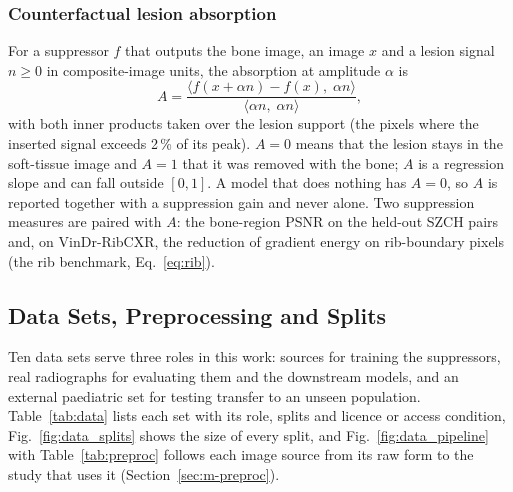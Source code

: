 \subsubsection{Counterfactual lesion absorption}
\label{sec:m-absorption}
For a suppressor $f$ that outputs the bone image, an image $x$ and a lesion signal $n\ge0$ in composite-image units, the absorption at
amplitude $\alpha$ is
\begin{equation}
A=\frac{\big\langle f(x+\alpha n)-f(x),\;\alpha n\big\rangle}{\big\langle \alpha n,\;\alpha n\big\rangle},
\label{eq:absorption}
\end{equation}
with both inner products taken over the lesion support (the pixels where the inserted signal exceeds 2\,\% of its peak). $A=0$ means that
the lesion stays in the soft-tissue image and $A=1$ that it was removed with the bone; $A$ is a regression slope and can fall outside
$[0,1]$. A model that does nothing has $A=0$, so $A$ is reported together with a suppression gain and never alone. Two suppression
measures are paired with $A$: the bone-region PSNR on the held-out SZCH pairs and, on VinDr-RibCXR, the reduction of gradient energy on
rib-boundary pixels (the rib benchmark, Eq.~\eqref{eq:rib}).

\subsection{Data Sets, Preprocessing and Splits}
\label{sec:m-data}
Ten data sets serve three roles in this work: sources for training the suppressors, real radiographs for evaluating them and the
downstream models, and an external paediatric set for testing transfer to an unseen population. Table~\ref{tab:data} lists each set with
its role, splits and licence or access condition, Fig.~\ref{fig:data_splits} shows the size of every split, and
Fig.~\ref{fig:data_pipeline} with Table~\ref{tab:preproc} follows each image source from its raw form to the study that uses it
(Section~\ref{sec:m-preproc}).

